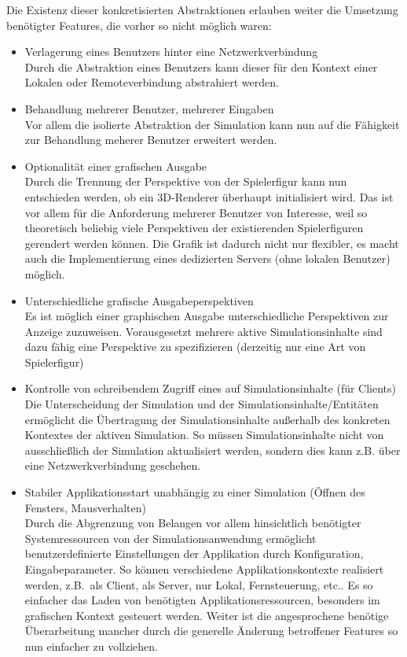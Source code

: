 \documentclass[11pt,twoside,a4paper]{article}
\begin{document}
Die Existenz dieser konkretisierten Abstraktionen erlauben weiter die Umsetzung benötigter Features, die vorher so nicht möglich waren:
\begin{itemize}
\item Verlagerung eines Benutzers hinter eine Netzwerkverbindung\\
	Durch die Abstraktion eines Benutzers kann dieser für den Kontext einer Lokalen oder Remoteverbindung abstrahiert werden.
\item Behandlung mehrerer Benutzer, mehrerer Eingaben\\
	Vor allem die isolierte Abstraktion der Simulation kann nun auf die Fähigkeit zur Behandlung meherer Benutzer erweitert werden.
\item Optionalität einer grafischen Ausgabe\\
	Durch die Trennung der Perspektive von der Spielerfigur kann nun entschieden werden, ob ein 3D-Renderer überhaupt initialisiert wird. Das ist vor allem für die Anforderung mehrerer Benutzer von Interesse, weil so theoretisch beliebig viele Perspektiven der existierenden Spielerfiguren gerendert werden können. Die Grafik ist dadurch nicht nur flexibler, es macht auch die Implementierung eines dedizierten Servers (ohne lokalen Benutzer) möglich.
\item Unterschiedliche grafische Ausgabeperspektiven\\
	Es ist möglich einer graphischen Ausgabe unterschiedliche Perspektiven zur Anzeige zuzuweisen. Vorausgesetzt mehrere aktive Simulationsinhalte sind dazu fähig eine Perspektive zu spezifizieren (derzeitig nur eine Art von Spielerfigur)
\item Kontrolle von schreibendem Zugriff eines auf Simulationsinhalte (für Clients)\\
Die Unterscheidung der Simulation und der Simulationsinhalte/Entitäten ermöglicht die Übertragung der Simulationsinhalte außerhalb des konkreten Kontextes der aktiven Simulation. So müssen Simulationsinhalte nicht von ausschließlich der Simulation aktualisiert werden, sondern dies kann z.B. über eine Netzwerkverbindung geschehen.
\item Stabiler Applikationsstart unabhängig zu einer Simulation (Öffnen des Fensters, Mausverhalten)\\
	Durch die Abgrenzung von Belangen vor allem hinsichtlich benötigter Systemressourcen von der Simulationsanwendung ermöglicht benutzerdefinierte Einstellungen der Applikation durch Konfiguration, Eingabeparameter.
	So können verschiedene Applikationskontexte realisiert werden, z.B.~als Client, als Server, nur Lokal, Fernsteuerung, etc..
	Es so einfacher das Laden von benötigten Applikationsressourcen, besonders im grafischen Kontext gesteuert werden.
	Weiter ist die angesprochene benötige Überarbeitung mancher durch die generelle Änderung betroffener Features so nun einfacher zu vollziehen.
\end{itemize}
\end{document}
